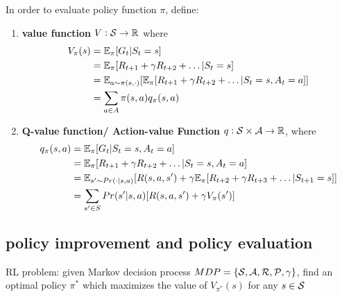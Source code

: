 \documentclass[11pt]{article}
\begin{document}
In order to evaluate policy function \(\pi\), define:
\begin{enumerate}
\item \textbf{value function} \(V:\mathcal{S}\to\mathbb{R}\) where 
\begin{align*}
V_\pi(s)&=\mathbb{E}_\pi[G_t|S_t=s]\\
&=\mathbb{E}_\pi[R_{t+1}+\gamma R_{t+2}+\dots|S_t=s]\\
&=\mathbb{E}_{a\sim\pi(s,\cdot)}[\mathbb{E}_\pi[R_{t+1}+\gamma R_{t+2}+\dots|S_t=s,A_t=a]]\\
&=\displaystyle\sum_{a\in A}\pi(s,a)q_\pi(s,a)
\end{align*}
\item \textbf{Q-value function/ Action-value Function} \(q:\mathcal{S}\times\mathcal{A}\to\mathbb{R}\), where
\begin{align*}
q_\pi(s,a)&=\mathbb{E}_\pi[G_t|S_t=s,A_t=a]\\
&=\mathbb{E}_\pi[R_{t+1}+\gamma R_{t+2}+\dots|S_t=s,A_t=a]\\
&=\mathbb{E}_{s'\sim Pr(\cdot|s,a)}[R(s,a,s')+\gamma
\mathbb{E}_\pi[R_{t+2}+\gamma R_{t+3}+\dots|S_{t+1}=s]]\\
&=\displaystyle\sum_{s'\in S}Pr(s'|s,a)[R(s,a,s')+\gamma V_\pi(s')]
\end{align*}
\end{enumerate}
\subsection{policy improvement and policy evaluation}
\label{sec:org44fc372}
RL problem: given Markov decision process
\(MDP=\{\mathcal{S},\mathcal{A},\mathcal{R},\mathcal{P},\gamma\}\), find an optimal policy \(\pi^*\)
which maximizes the value of \(V_{\pi^*}(s)\) for any \(s\in\mathcal{S}\)
\end{document}
